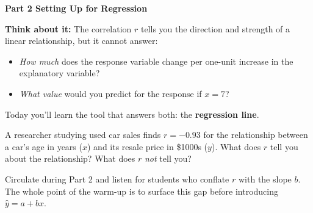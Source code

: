 \documentclass[10pt]{article}
\begin{document}
\vspace{0.28in}

{\large\bfseries\color{navy} Part 2 \quad Setting Up for Regression}

\vspace{0.12in}

\begin{tcolorbox}[colback=greenbg, colframe=greenacc, boxrule=0.8pt, arc=2mm,
    left=4mm, right=4mm, top=3mm, bottom=3mm]
    \small
    \textbf{Think about it:} The correlation $r$ tells you the direction and strength of a
    linear relationship, but it cannot answer:
    \begin{itemize}[leftmargin=1.3em, itemsep=3pt]
      \item \emph{How much} does the response variable change per one-unit increase in the
            explanatory variable?
      \item \emph{What value} would you predict for the response if $x = 7$?
    \end{itemize}
    Today you'll learn the tool that answers both: the \textbf{regression line}.
\end{tcolorbox}

\vspace{0.14in}

\noindent A researcher studying used car sales finds $r = -0.93$ for the relationship between a
car's age in years ($x$) and its resale price in \$1000s ($y$). What does $r$ tell you about the
relationship? What does $r$ \emph{not} tell you?\\[8pt]

\begin{teachernote}
Circulate during Part 2 and listen for students who conflate $r$ with the slope $b$. The whole
point of the warm-up is to surface this gap before introducing $\hat{y} = a + bx$.
\end{teachernote}
\end{document}
